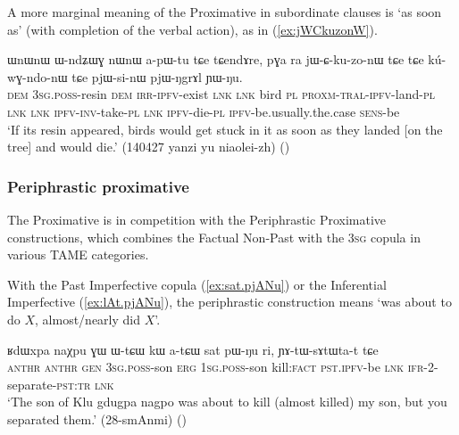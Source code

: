 A more marginal meaning of the Proximative in subordinate clauses is `as soon as' (with completion of the verbal action), as in (\ref{ex:jWCkuzonW}).

 \begin{exe} 
\ex \label{ex:jWCkuzonW}
\gll  ɯnɯnɯ ɯ-ndʑɯɣ nɯnɯ a-pɯ-tu tɕe tɕendɤre, pɣa ra jɯ-ɕ-ku-zo-nɯ tɕe tɕe kú-wɣ-ndo-nɯ tɕe pjɯ-si-nɯ pjɯ-ŋgrɤl ɲɯ-ŋu. \\
\textsc{dem} \textsc{3sg}.\textsc{poss}-resin \textsc{dem} \textsc{irr}-\textsc{ipfv}-exist \textsc{lnk} \textsc{lnk} bird \textsc{pl} \textsc{proxm}-\textsc{tral}-\textsc{ipfv}-land-\textsc{pl} \textsc{lnk} \textsc{lnk} \textsc{ipfv}-\textsc{inv}-take-\textsc{pl} \textsc{lnk} \textsc{ipfv}-die-\textsc{pl} \textsc{ipfv}-be.usually.the.case \textsc{sens}-be \\
\glt `If its resin appeared, birds would get stuck in it as soon as they landed [on the tree] and would die.' (140427 yanzi yu niaolei-zh)
()
 \end{exe}
 

 
\subsubsection{Periphrastic proximative} \label{sec:proximative.periphrastic}
The Proximative is in competition with the Periphrastic Proximative constructions, which combines the Factual Non-Past with the \textsc{3sg} copula in various TAME categories.

With the Past Imperfective copula  (\ref{ex:sat.pjANu}) or the Inferential Imperfective  (\ref{ex:lAt.pjANu}), the periphrastic construction means `was about to do $X$, almost/nearly did $X$'.

  \begin{exe} 
\ex \label{ex:sat.pjANu}
\gll ʁdɯxpa naχpu ɣɯ ɯ-tɕɯ kɯ a-tɕɯ sat pɯ-ŋu ri, ɲɤ-tɯ-sɤtɯta-t tɕe  \\
\textsc{anthr}  \textsc{anthr} \textsc{gen} \textsc{3sg}.\textsc{poss}-son \textsc{erg} \textsc{1sg}.\textsc{poss}-son kill:\textsc{fact} \textsc{pst}.\textsc{ipfv}-be \textsc{lnk} \textsc{ifr}-2-separate-\textsc{pst}:\textsc{tr} \textsc{lnk} \\
\glt `The son of Klu gdugpa nagpo was about to kill (almost killed) my son, but you separated them.' (28-smAnmi)
()
 \end{exe}
 
